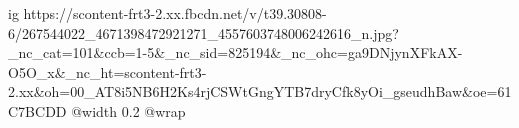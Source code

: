  
 
 
 
 

\ifcmt
  ig https://scontent-frt3-2.xx.fbcdn.net/v/t39.30808-6/267544022_4671398472921271_4557603748006242616_n.jpg?_nc_cat=101&ccb=1-5&_nc_sid=825194&_nc_ohc=ga9DNjynXFkAX-O5O_x&_nc_ht=scontent-frt3-2.xx&oh=00_AT8i5NB6H2Ks4rjCSWtGngYTB7dryCfk8yOi_gseudhBaw&oe=61C7BCDD
  @width 0.2
  @wrap 
\fi
